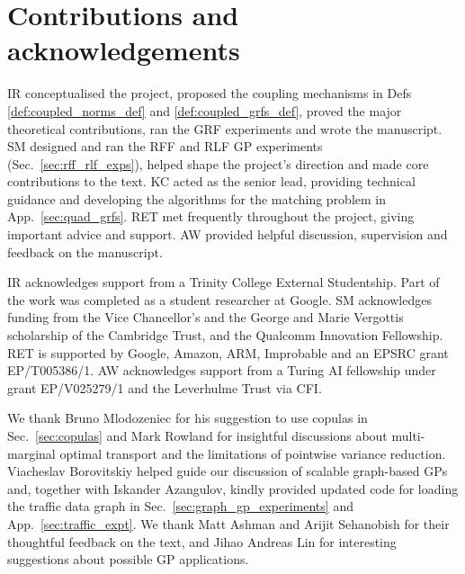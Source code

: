 \section{Contributions and acknowledgements}
IR conceptualised the project, proposed the coupling mechanisms in Defs \ref{def:coupled_norms_def} and \ref{def:coupled_grfs_def}, proved the major theoretical contributions, ran the GRF experiments and wrote the manuscript. 
SM designed and ran the RFF and RLF GP experiments (Sec.~\ref{sec:rff_rlf_exps}), helped shape the project's direction and made core contributions to the text. 
KC acted as the senior lead, providing technical guidance and developing the algorithms for the matching problem in App.~\ref{sec:quad_grfs}.
RET met frequently throughout the project, giving important advice and support. 
AW provided helpful discussion, supervision and feedback on the manuscript.  

IR acknowledges support from a Trinity College External Studentship. 
Part of the work was completed as a student researcher at Google.
SM acknowledges funding from the Vice Chancellor’s and the George and Marie Vergottis scholarship of the Cambridge Trust, and the Qualcomm Innovation Fellowship.
RET is supported by Google, Amazon, ARM, Improbable and an EPSRC grant EP/T005386/1.
AW acknowledges support from a Turing AI fellowship under grant EP/V025279/1 and the Leverhulme Trust via CFI.

We thank Bruno Mlodozeniec for his suggestion to use copulas in Sec.~\ref{sec:copulas} and Mark Rowland for insightful discussions about multi-marginal optimal transport and the limitations of pointwise variance reduction. 
Viacheslav Borovitskiy helped guide our discussion of scalable graph-based GPs and, together with Iskander Azangulov, kindly provided updated code for loading the traffic data graph in Sec.~\ref{sec:graph_gp_experiments} and App.~\ref{sec:traffic_expt}.
We thank Matt Ashman and Arijit Sehanobish for their thoughtful feedback on the text, and Jihao Andreas Lin for interesting suggestions about possible GP applications.